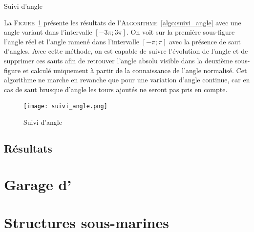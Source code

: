 				\begin{algorithm}[!htb]
			
					\caption{Suivi d'angle} 
					\label{algo:suivi_angle}
				\end{algorithm}
			
				La \textsc{Figure}~\ref{fig:suivi_angle} présente les résultats de l'\textsc{Algorithme}~\ref{algo:suivi_angle} avec une angle variant dans l'intervalle $[-3\pi; 3\pi]$. On voit sur la première sous-figure l'angle réel et l'angle ramené dans l'intervalle $[-\pi; \pi]$ avec la présence de saut d'angles. Avec cette méthode, on est capable de suivre l'évolution de l'angle et de supprimer ces sauts afin de retrouver l'angle absolu visible dans la deuxième sous-figure et calculé uniquement à partir de la connaissance de l'angle normalisé. Cet algorithme ne marche en revanche que pour une variation d'angle continue, car en cas de saut brusque d'angle les tours ajoutés ne seront pas pris en compte.
			
				\begin{figure}[!htb]
					\centering
					\texttt{[image: suivi\_angle.png]}
					\caption{Suivi d'angle}
					\label{fig:suivi_angle}
				\end{figure}		
		
		\subsection{Résultats}

		\section{Garage d'\argos{}}

		\section{Structures sous-marines}
		